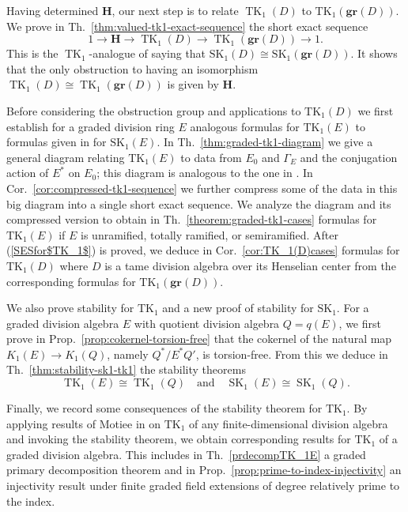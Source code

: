 \documentclass[11pt]{article}
\numberwithin{equation}{section}
\theoremstyle{plain}
\theoremstyle{remark}
\newcommand{\gr}{\mathbf{gr}}
\newcommand{\grd}{\gr(D)}
\newcommand{\opn}{\operatorname}
\newcommand{\SK}{\opn{SK_1}}
\newcommand{\TK}{\opn{TK_1}}
\begin{document}
Having determined $\mathbf{H}$, our next step is to relate $\operatorname{TK}_1(D)$ to $\TK(\gr(D))$. We prove 
in Th.~\ref{thm:valued-tk1-exact-sequence} 
the short exact sequence
\begin{equation}
\label{SESfor$TK_1$}
        1\longrightarrow \mathbf{H}
        \longrightarrow \operatorname{TK}_1(D)
        \longrightarrow \operatorname{TK}_1(\grd)
        \longrightarrow 1.
\end{equation}
This is the $\operatorname{TK}_1$-analogue of  \cite[Th.~4.8]{hazrat-wadsworth-2011}  saying that 
$\SK(D) \cong\SK(\grd)$.
It shows that the only obstruction to having an isomorphism 
$\operatorname{TK}_1(D)\cong\operatorname{TK}_1(\grd)$ is 
given by $\mathbf{H}$. 

Before considering the obstruction group and applications to $\TK(D)$ we first establish for a graded division ring $E$
analogous formulas for $\TK(E)$  to formulas  given in \cite{hazrat-wadsworth-2011} for $\SK(E)$.  In 
Th.~\ref{thm:graded-tk1-diagram} we give a general diagram relating $\TK(E)$ to data from  $E_0$ and $\Gamma_E$
and the conjugation action of $E^*$ on $E_0$; 
this diagram is 
 analogous to the one in \cite[Th.~3.4]{hazrat-wadsworth-2011}.
  In Cor.~\ref{cor:compressed-tk1-sequence} we further compress some of the data in this big diagram into a single 
  short exact sequence.  
 We analyze the diagram and its compressed version to obtain in 
 Th.~\ref{theorem:graded-tk1-cases}  formulas for 
 $\TK(E)$ if $E$ is unramified, totally ramified, or semiramified.  After (\ref{SESfor$TK_1$}) is proved, we deduce
 in Cor.~\ref{cor:TK_1(D)cases}
 formulas for $\TK(D)$ where $D$ is a tame division algebra over its Henselian center from the corresponding 
 formulas for 
 $\TK(\gr(D))$.

We also prove  stability for $\TK$ and a new proof of stability for $\SK$. For a graded division algebra $E$ with 
quotient division algebra $Q=q(E)$, we first prove
in Prop.~\ref{prop:cokernel-torsion-free}  that the cokernel of the natural map $K_1(E)\to K_1(Q)$, namely
  $Q^*/E^*Q'$, is torsion-free. From this we  deduce in Th.~\ref{thm:stability-sk1-tk1} the stability 
  theorems
$$
        \operatorname{TK}_1(E)\cong \operatorname{TK}_1(Q)
        \quad \text{and}\quad
        \operatorname{SK}_1(E)\cong \operatorname{SK}_1(Q).
$$

Finally, we record some consequences of the stability theorem for $\TK$. 
By applying results of Motiee in \cite{motiee-2013} on 
$\TK$ of any 
finite-dimensional  division algebra and invoking the stability theorem, we obtain corresponding results for 
$\TK$ of a graded division algebra.   This includes in Th.~\ref{prdecompTK_1E}
 a graded primary decomposition theorem and in Prop.~\ref{prop:prime-to-index-injectivity} an injectivity result under 
 finite graded field extensions of degree 
 relatively prime to the index. 
 
\end{document}
